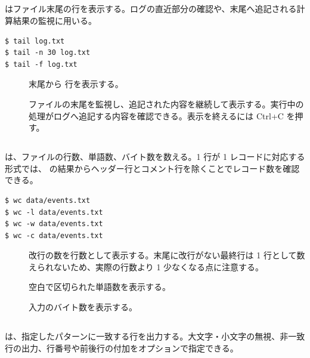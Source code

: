 \subsection{}

 はファイル末尾の行を表示する。ログの直近部分の確認や、末尾へ追記される計算結果の監視に用いる。

\begin{lstlisting}[numbers=none, xleftmargin=2\zw]
$ tail log.txt
$ tail -n 30 log.txt
$ tail -f log.txt
\end{lstlisting}

\begin{description}
\item[] 末尾から  行を表示する。
\item[] ファイルの末尾を監視し、追記された内容を継続して表示する。実行中の処理がログへ追記する内容を確認できる。表示を終えるには Ctrl+C を押す。
\end{description}

\subsection{}

 は、ファイルの行数、単語数、バイト数を数える。1 行が 1 レコードに対応する形式では、 の結果からヘッダー行とコメント行を除くことでレコード数を確認できる。

\begin{lstlisting}[numbers=none, xleftmargin=2\zw]
$ wc data/events.txt
$ wc -l data/events.txt
$ wc -w data/events.txt
$ wc -c data/events.txt
\end{lstlisting}

\begin{description}
\item[] 改行の数を行数として表示する。末尾に改行がない最終行は 1 行として数えられないため、実際の行数より 1 少なくなる点に注意する。
\item[] 空白で区切られた単語数を表示する。
\item[] 入力のバイト数を表示する。
\end{description}

\subsection{}

 は、指定したパターンに一致する行を出力する。大文字・小文字の無視、非一致行の出力、行番号や前後行の付加をオプションで指定できる。

